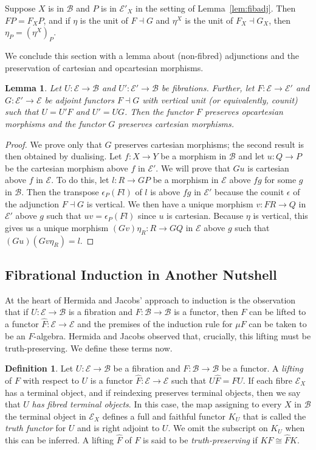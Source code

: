 \documentclass{LMCS}
\newcommand{\ra}{\rightarrow}
\newcommand\E{{\mathcal E}}
\newcommand\B{{\mathcal B}}
\theoremstyle{plain}
\newtheorem{lemma}[theorem]{Lemma}
\theoremstyle{remark}
\theoremstyle{definition}
\newtheorem{definition}[theorem]{Definition}
\begin{document}
\noindent
Suppose $X$ is in $\B$ and $P$ is in $\E'_X$ in the setting of
Lemma~\ref{lem:fibadj}. Then $FP = F_XP$, and if $\eta$ is the unit of
$F \dashv G$ and $\eta^X$ is the unit of $F_X \dashv G_X$, then
$\eta_P = (\eta^X)_P$.

We conclude this section with a lemma about (non-fibred) adjunctions
and the preservation of cartesian and opcartesian morphisms.
\begin{lemma}\label{lem:adjandcart}
  Let $U:\E\to\B$ and $U':\E'\to\B$ be fibrations. Further, let
  $F:\E\to\E'$ and $G:\E'\to\E$ be adjoint functors $F \dashv G$ with
  vertical unit (or equivalently, counit) such that $U = U' F$
  and $U' = U G$. Then the functor $F$ preserves opcartesian
  morphisms and the functor $G$ preserves cartesian morphisms.
\end{lemma}
\begin{proof}
  We prove only that $G$ preserves cartesian morphisms; the second
  result is then obtained by dualising. Let $f:X\to Y$ be a morphism
  in $\B$ and let $u:Q\to P$ be the cartesian morphism above $f$ in
  $\E'$. We will prove that $G u$ is cartesian above $f$ in $\E$. To
  do this, let $l:R\to G P$ be a morphism in $\E$ above $f g$ for some
  $g$ in $\B$. Then the transpose $ \epsilon_P (Fl)$ of $l$ is above $
  f g$ in $\E'$ because the counit $\epsilon$ of the adjunction $F
  \dashv G$ is vertical. We then have a unique morphism $v:FR\to Q$ in
  $\E'$ above $g$ such that $uv = \epsilon_P (F l)$ since $u$ is
  cartesian. Because $\eta$ is vertical, this gives us a unique
  morphism $ (Gv) \eta_R:R\to GQ$ in $\E$ above $g$ such that $(Gu)
  (Gv\eta_R) = l$.
\end{proof}

\subsection{Fibrational Induction in Another Nutshell}

At the heart of Hermida and Jacobs' approach to induction is the
observation that if $U:\E \ra \B$ is a fibration and $F:\B \ra \B$ is
a functor, then $F$ can be lifted to a functor $\hat{F}:\E \ra \E$ and
the premises of the induction rule for $\mu F$ can be taken to be an
$\hat{F}$-algebra. Hermida and Jacobs observed that, crucially, this
lifting must be truth-preserving. We define these terms now.

\begin{definition}\label{def:multi}
  Let $U : \E \rightarrow \B$ be a fibration and $F : \B \to \B$ be a
  functor.  A {\em lifting} of $F$ with respect to $U$ is a functor
  $\hat{F}:\E \rightarrow \E$ such that $U \hat{F} = F U$.  If each
  fibre $\E_X$ has a terminal object, and if reindexing preserves
  terminal objects, then we say that $U$ {\em has fibred terminal
    objects}. In this case, the map assigning to every $X$ in $\B$ the
  terminal object in $\E_X$ defines a full and faithful functor $K_U$
  that is called the {\em truth functor} for $U$ and is right adjoint
  to $U$. We omit the subscript on $K_U$ when this can be inferred. A
  lifting $\hat{F}$ of $F$ is said to be {\em truth-preserving} if $K
  F \cong \hat{F} K$.
\end{definition}
\end{document}
